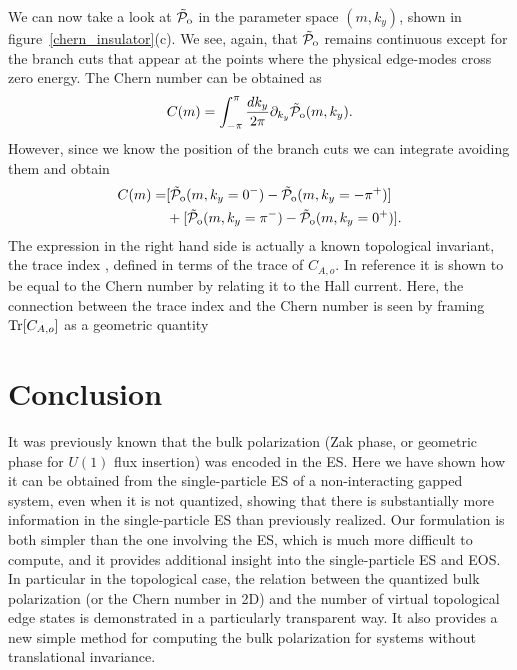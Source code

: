 \documentclass[twocolumn,amsmath,longbibliography,amssymb,superscriptaddress]{revtex4-1}
\newcommand{\tpo}{\tilde{\mathcal{P}}_{\rm o}}
\begin{document}
We can now take a look at $\tpo$ in the parameter space $(m,k_y)$, shown in figure~\ref{chern_insulator}(c). We see, again, that $\tpo$ remains continuous except for the branch cuts that appear at the points where the physical edge-modes cross zero energy. The Chern number can be obtained as
\begin{equation}
C(m) = \int_{-\pi}^{\pi}\frac{dk_y}{2\pi} \partial_{k_y} \tpo(m,k_y).
\label{eq:Zaletel_chern}
\end{equation}
However, since we know the position of the branch cuts we can integrate avoiding them and obtain
\begin{align}
C(m) =& [\tpo(m,k_y=0^-)-\tpo(m,k_y=-\pi^+)] \nonumber \\ 
&+[\tpo(m,k_y=\pi^-)-\tpo(m,k_y=0^+)]. 
\end{align}
The expression in the right hand side is actually a known topological invariant, the trace index \cite{Alexandrinata2011}, defined in terms of the trace of $C_{A,o}$. In reference \cite{Alexandrinata2011} it is shown to be equal to the Chern number by relating it to the Hall current. Here, the connection between the trace index and the Chern number is seen by framing $\Tr[C_{A,o}]$ as a geometric quantity 





\section{Conclusion}

It was previously known that the bulk polarization (Zak phase, or geometric phase for $U(1)$ flux insertion) was encoded in the ES. Here we have shown how it can be obtained from the single-particle ES of a non-interacting gapped system, even when it is not quantized, showing that there is substantially more information in the single-particle ES than previously realized. 
Our formulation is both simpler than the one involving the ES, which is much more difficult to compute, and it provides additional insight into the single-particle ES and EOS. In particular in the topological case, the relation between the quantized bulk polarization (or the Chern number in 2D) and the number of virtual topological edge states is demonstrated in a particularly transparent way. It also provides a new simple method for computing the bulk polarization for systems without translational invariance. 
\end{document}
